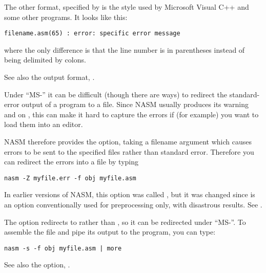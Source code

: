 The other format, specified by  is the style used by
Microsoft Visual C++ and some other programs. It looks like this:

\begin{lstlisting}
filename.asm(65) : error: specific error message
\end{lstlisting}

where the only difference is that the line number is in parentheses
instead of being delimited by colons.

See also the  output format, .


Under ``MS-'' it can be difficult (though there are
ways) to redirect the standard-error output of a program to a file.
Since NASM usually produces its warning and 
on , this can make it hard to capture the
errors if (for example) you want to load them into an editor.

NASM therefore provides the  option, taking a filename argument
which causes errors to be sent to the specified files rather than standard
error. Therefore you can redirect the errors
into a file by typing

\begin{lstlisting}
nasm -Z myfile.err -f obj myfile.asm
\end{lstlisting}

In earlier versions of NASM, this option was called ,
but it was changed since  is an option conventionally
used for preprocessing only, with disastrous results.
See .


The  option redirects  to
 rather than , so it can be redirected
under ``MS-''. To assemble the file 
and pipe its output to the  program, you can type:

\begin{lstlisting}
nasm -s -f obj myfile.asm | more
\end{lstlisting}

See also the  option, .


